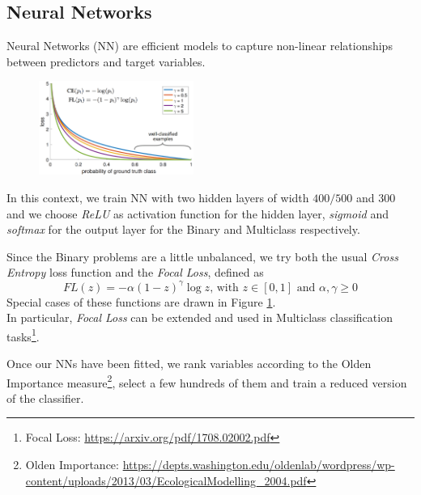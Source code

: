 \documentclass[a4paper,11pt, oneside]{article}  %
\begin{document}
\subsection{Neural Networks}
Neural Networks (NN) are efficient models to capture non-linear relationships between predictors and target variables.

\begin{figure}
	\includegraphics[width=0.45\textwidth]{nn-focal-loss.png}
	\label{fig3}
\end{figure}
In this context, we train NN with two hidden layers of width $400/500$ and $300$ and we choose \textit{ReLU} as activation function for the hidden layer, \textit{sigmoid} and \textit{softmax} for the output layer for the  Binary and Multiclass respectively.

Since the Binary problems are a little unbalanced, we try both the usual \textit{Cross Entropy} loss function and the \textit{Focal Loss}, defined as 
\begin{equation*}
	FL(z) = - \alpha (1 - z)^{\gamma} \log{z} \text{, with }z \in [0,1]  \text{ and } \alpha,  \gamma \geq 0
\end{equation*}
Special cases of these functions are drawn in Figure \ref{fig3}. \\
In particular, \textit{Focal Loss} can be extended and used in Multiclass classification tasks\footnote{Focal Loss: \url{https://arxiv.org/pdf/1708.02002.pdf}}.

Once our NNs have been fitted, we rank variables according to the Olden Importance measure\footnote{Olden Importance: \url{https://depts.washington.edu/oldenlab/wordpress/wp-content/uploads/2013/03/EcologicalModelling_2004.pdf}},  select a few hundreds of them and train a reduced version of the classifier. 
\end{document}

